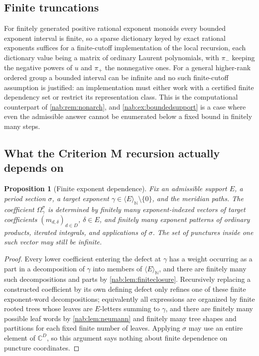 \documentclass[11pt,letterpaper]{article}
\newtheorem{proposition}[proposition]{Proposition}
\theoremstyle{definition}
\theoremstyle{remark}
\newcommand{\C}{\mathbb C}
\newcommand{\N}{\mathbb N}
\newcommand{\angles}[1]{\langle #1\rangle_{\N}}
\numberwithin{equation}{section}
\begin{document}
\subsection{Finite truncations}

For finitely generated positive rational exponent monoids every bounded
exponent interval is finite, so a sparse dictionary keyed by exact rational
exponents suffices for a finite-cutoff implementation of the local recursion,
each dictionary value being a matrix of ordinary Laurent polynomials, with
$\pi_-$ keeping the negative powers of $u$ and $\pi_+$ the nonnegative ones.
For a general higher-rank ordered group a bounded interval can be infinite and
no such finite-cutoff assumption is justified: an implementation must either
work with a certified finite dependency set or restrict its representation
class. This is the computational counterpart of \cref{nab:rem:nonarch}, and
\cref{nab:ex:boundedsupport} is a case where even the admissible answer cannot
be enumerated below a fixed bound in finitely many steps.

\subsection{What the Criterion M recursion actually depends on}

\begin{proposition}[Finite exponent dependence]\label{nab:prop:dependence}
Fix an admissible support $E$, a period section $\sigma$, a target exponent
$\gamma\in\angles E\setminus\{0\}$, and the meridian paths. The coefficient
$\Omega^\sigma_\gamma$ is determined by finitely many exponent-indexed vectors
of target coefficients $(m_{d,\delta})_{d\in D}$, $\delta\in E$, and finitely
many exponent patterns of ordinary products, iterated integrals, and
applications of $\sigma$. The set of punctures inside one such vector may still
be infinite.
\end{proposition}

\begin{proof}
Every lower coefficient entering the defect at $\gamma$ has a weight occurring
as a part in a decomposition of $\gamma$ into members of $\angles E$, and there
are finitely many such decompositions and parts by
\cref{nab:lem:finiteclosure}. Recursively replacing a constructed coefficient
by its own defining defect only refines one of these finite exponent-word
decompositions; equivalently all expressions are organized by finite rooted
trees whose leaves are $E$-letters summing to $\gamma$, and there are finitely
many possible leaf words by \cref{nab:lem:neumann} and finitely many tree
shapes and partitions for each fixed finite number of leaves. Applying $\sigma$
may use an entire element of $\C^D$, so this argument says nothing about
finite dependence on puncture coordinates.
\end{proof}
\end{document}
